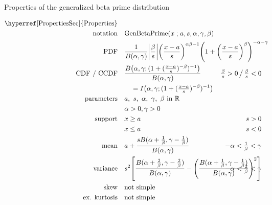 

\begin{table*}[p]
\caption[Generalized beta prime distribution -- Properties]{Properties of the generalized beta prime distribution}
\begin{align*}
 \text{\hyperref[PropertiesSec]{Properties}}  \quad& \\
\text{notation} \quad & \text{GenBetaPrime}(x\given a, s, \alpha,\gamma,\beta)   \checked
\\
\text{PDF}\quad &    \frac{1}{B(\alpha, \gamma)} \Left|\frac{\beta}{s}\Right|	
\Left(\frac{x-a}{s}\Right)^{\alpha\beta -1} \Left(1+ \Left(\frac{x-a}{s}\Right)^\beta \Right)^{-\alpha-\gamma } \checked
\hspace{-30em}
\\
\text{CDF / CCDF} \quad  &  
\frac{B\big(\alpha, \gamma; (1+(\tfrac{x-a}{s})^{-\beta})^{-1} \big) }{B(\alpha,\gamma)} \checked
\hspace{-7em}
& \tfrac{\beta}{s} >0 \,\big/ \, \tfrac{\beta}{s} <0
\\ 
& \quad = I\Left(  \alpha,\gamma; (1+(\tfrac{x-a}{s})^{-\beta})^{-1} \Right)  \checked
\\
\text{parameters}\quad &   a,\ s,\ \alpha,\ \gamma,\ \beta \text{ in } \Real \checked 
\\ & \alpha>0, \gamma>0	\checked
\\
\text{support} \quad &    x \geq a &  s > 0 										
\\
&  x\leq a  &  s < 0 
\\
\text{mean} \quad  &   a+\frac{s B(\alpha+\tfrac{1}{\beta},\gamma- \tfrac{1}{\beta}) }{B(\alpha,\gamma)} 
\checked &   -\alpha< \tfrac{1}{\beta} <\gamma \checked
\\
\text{variance} \quad  &s^2\Left[\frac{ B(\alpha+\tfrac{2}{\beta},\gamma- \tfrac{2}{\beta}) }{B(\alpha,\gamma)} -  \Left(\frac{ B(\alpha+\tfrac{1}{\beta},\gamma- \tfrac{1}{\beta}) }{B(\alpha,\gamma)}\Right)^2 \Right]  \hspace{-15em}
& -\alpha< \tfrac{2}{\beta} <\gamma \checked
\\
\text{skew} \quad  &  \text{not simple}
\\
\text{ex. kurtosis} \quad  &  \text{not simple}

\end{align*}
\end{table*}
